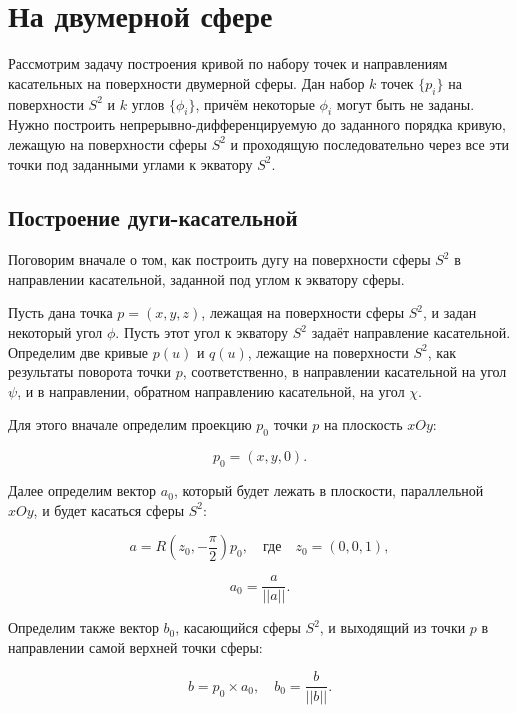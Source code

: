 \section{На двумерной сфере}

Рассмотрим задачу построения кривой по набору точек и направлениям касательных на поверхности двумерной сферы.
Дан набор $k$ точек $\{p_i\}$ на поверхности $S^2$ и $k$ углов $\{\phi_i\}$, причём некоторые $\phi_i$ могут быть
не заданы. Нужно построить непрерывно-дифференцируемую до заданного порядка кривую, лежащую на поверхности сферы $S^2$ и
проходящую последовательно через все эти точки под заданными углами к экватору $S^2$.

\subsection*{Построение дуги-касательной}

Поговорим вначале о том, как построить дугу на поверхности сферы $S^2$ в направлении касательной, заданной под углом к
экватору сферы.

Пусть дана точка $p=(x,y,z)$, лежащая на поверхности сферы $S^2$, и задан некоторый угол $\phi$. Пусть этот угол к
экватору $S^2$ задаёт направление касательной. Определим две кривые $p(u)$ и $q(u)$, лежащие на поверхности $S^2$,
как результаты поворота точки $p$, соответственно, в направлении касательной на угол $\psi$, и в направлении,
обратном направлению касательной, на угол $\chi$.

Для этого вначале определим проекцию $p_0$ точки $p$ на плоскость $xOy$:

$$
p_0=(x,y,0).
$$

Далее определим вектор $a_0$, который будет лежать в плоскости, параллельной $xOy$, и будет касаться сферы $S^2$:

$$
a=R(z_0,-\frac{\pi}{2})p_0, \quad \text{где} \quad z_0=(0,0,1),
$$

\begin{equation}
a_0=\frac{a}{||a||}.
\label{two-dimension-tangent-axis-1}
\end{equation}

Определим также вектор $b_0$, касающийся сферы $S^2$, и выходящий из точки $p$ в направлении самой верхней точки сферы:

\begin{equation}
b=p_0 \times a_0, \quad b_0=\frac{b}{||b||}.
\label{two-dimension-tangent-axis-2}
\end{equation}

